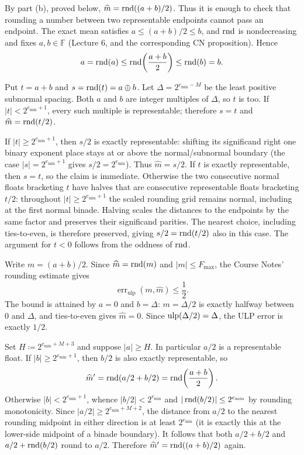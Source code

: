 \documentclass[11pt,oneside]{article}
\begin{document}
\begin{solution}
\begin{problemsubparts}
\item By part (b), proved below,
$\widehat m=\operatorname{rnd}((a+b)/2)$. Thus it is enough to check that
rounding a number between two representable endpoints cannot pass
an endpoint. The exact mean satisfies
$a\le(a+b)/2\le b$, and $\operatorname{rnd}$ is nondecreasing and fixes
$a, b\in\mathbb F$ (Lecture 6, and the corresponding CN proposition).
Hence
\[
 a=\operatorname{rnd}(a)\le\operatorname{rnd}\!\left(\frac{a+b}{2}\right)
 \le\operatorname{rnd}(b)=b.
\]

\item Put $t=a+b$ and $s=\operatorname{rnd}(t)=a\oplus b$. Let
$\Delta=2^{e_{\min}-M}$ be the least positive subnormal spacing.
Both $a$ and $b$ are integer multiples of $\Delta$, so $t$ is too.
If $|t|<2^{e_{\min}+1}$, every such multiple is representable;
therefore $s=t$ and
$\widehat m=\operatorname{rnd}(t/2)$.

If $|t|\ge2^{e_{\min}+1}$, then $s/2$ is exactly
representable: shifting its significand right one binary exponent
place stays at or above the normal/subnormal boundary (the case
$|s|=2^{e_{\min}+1}$ gives $s/2=2^{e_{\min}}$).
Thus $\widehat m=s/2$. If $t$ is exactly representable,
then $s=t$, so the claim is immediate. Otherwise the two consecutive
normal floats bracketing $t$ have halves that are consecutive
representable floats bracketing $t/2$: throughout
$|t|\ge2^{e_{\min}+1}$ the scaled rounding grid remains normal,
including at the first normal binade. Halving scales the distances
to the endpoints by the same factor and preserves their significand
parities. The nearest choice, including ties-to-even, is therefore
preserved, giving $s/2=\operatorname{rnd}(t/2)$ also in this case.
The argument for $t<0$ follows from the oddness of $\operatorname{rnd}$.

Write $m=(a+b)/2$. Since $\widehat m=\operatorname{rnd}(m)$ and
$|m|\le F_{\max}$, the Course Notes' rounding estimate gives
\[
 \operatorname{err}_{\mathrm{ulp}}(m, \widehat m)\le\frac12.
\]
The bound is attained by $a=0$ and $b=\Delta$:
$m=\Delta/2$ is exactly halfway between $0$ and $\Delta$,
and ties-to-even gives $\widehat m=0$. Since
$\operatorname{ulp}(\Delta/2)=\Delta$, the ULP error is exactly $1/2$.

\item Set $H\coloneqq2^{e_{\min}+M+3}$ and suppose
$|a|\ge H$. In particular $a/2$ is a representable float.
If $|b|\ge2^{e_{\min}+1}$, then $b/2$ is also exactly
representable, so
\[
 \widehat m'=\operatorname{rnd}(a/2+b/2)
 =\operatorname{rnd}\!\left(\frac{a+b}{2}\right).
\]
Otherwise $|b|<2^{e_{\min}+1}$, whence
$|b/2|<2^{e_{\min}}$ and
$|\operatorname{rnd}(b/2)|\le2^{e_{\min}}$ by rounding monotonicity.
Since $|a/2|\ge2^{e_{\min}+M+2}$, the distance from
$a/2$ to the nearest rounding midpoint in either direction is
at least $2^{e_{\min}}$ (it is exactly this at the lower-side
midpoint of a binade boundary). It follows that both
$a/2+b/2$ and $a/2+\operatorname{rnd}(b/2)$ round to $a/2$.
Therefore $\widehat m'=\operatorname{rnd}((a+b)/2)$ again.


\end{problemsubparts}
\end{solution}
\end{document}
